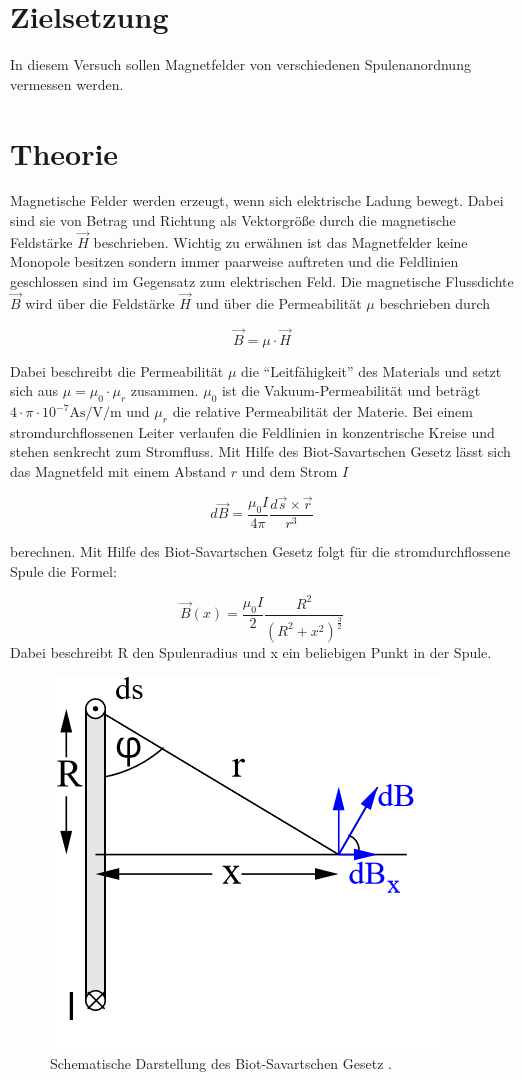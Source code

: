 \section{Zielsetzung}
In diesem Versuch sollen Magnetfelder von verschiedenen Spulenanordnung vermessen werden.
\section{Theorie}
Magnetische Felder werden erzeugt, wenn sich elektrische Ladung bewegt.
Dabei sind sie von Betrag und Richtung als Vektorgröße durch die magnetische Feldstärke
$\vec{H}$ beschrieben. Wichtig zu erwähnen ist das Magnetfelder keine Monopole besitzen
sondern immer paarweise auftreten und die Feldlinien geschlossen sind im Gegensatz zum elektrischen Feld.
Die magnetische Flussdichte $\vec{B}$ wird über die Feldstärke $\vec{H}$ und über die
Permeabilität $\mu$ beschrieben durch

\begin{equation}
  \vec{B} = \mu \cdot \vec{H}
  \label{eq:1}
\end{equation}

Dabei beschreibt die Permeabilität $\mu$ die \enquote{Leitfähigkeit} des Materials und setzt sich
aus $\mu = \mu_0 \cdot \mu_r$ zusammen. $\mu_0$ ist die Vakuum-Permeabilität und beträgt $4 \cdot \pi \cdot 10^{-7} \si{\ampere\second \per\volt\per\meter}$
und $\mu_r$ die relative Permeabilität der Materie.
Bei einem stromdurchflossenen Leiter verlaufen die Feldlinien in konzentrische Kreise und
stehen senkrecht zum Stromfluss. Mit Hilfe des Biot-Savartschen Gesetz lässt sich
das Magnetfeld mit einem Abstand $r$ und dem Strom $I$

\begin{equation*}
  d\vec{B} = \frac{\mu_0 I}{4\pi} \frac{d\vec{s} \times \vec{r}}{r^3}
\end{equation*}

berechnen. Mit Hilfe des Biot-Savartschen Gesetz folgt für die stromdurchflossene Spule die Formel:

\begin{equation}
  \vec{B}(x) = \frac{\mu_0 I}{2} \frac{R^2}{(R^2 + x^2)^{\frac{3}{2}}}
  \label{eq:2}
\end{equation}
Dabei  beschreibt R den Spulenradius und x ein beliebigen Punkt in der Spule.
\begin{figure}[H]
  \centering
  \includegraphics[width=5 cm , height=3.5 cm]{Abb1.png}
	\caption{Schematische Darstellung des Biot-Savartschen Gesetz \cite{1}.}
	\label{abb:1}
\end{figure}

